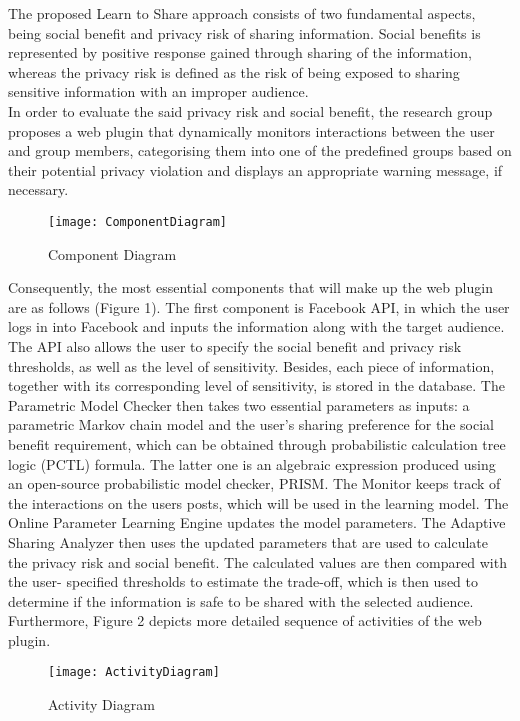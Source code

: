 \documentclass[a4paper,11pt]{article}
\begin{document}
The proposed Learn to Share approach consists of two fundamental aspects, being social benefit and privacy risk of sharing information. Social benefits is represented by positive response gained through sharing of the information, whereas the privacy risk is defined as the risk of being exposed to sharing sensitive information with an improper audience.\\
\indent In order to evaluate the said privacy risk and social benefit, the research group proposes a web plugin that dynamically monitors interactions between the user and group members, categorising them into one of the predefined groups based on their potential privacy violation  and displays an appropriate warning message, if necessary. 
\begin{figure}[H]
	\centering
	\texttt{[image: ComponentDiagram]}
	\caption{Component Diagram}
\end{figure}

Consequently, the most essential components that will make up the web plugin are as follows (Figure 1). The first component is Facebook API, in which the user logs in into Facebook and inputs the information along with the target audience. The API also allows the user to specify the social benefit and privacy risk thresholds, as well as the level of sensitivity. Besides, each piece of information, together with its corresponding level of sensitivity, is stored in the database. The Parametric Model Checker then takes two essential parameters as inputs: a parametric Markov chain model and the user's sharing preference for the social benefit requirement, which can be obtained through probabilistic calculation tree logic (PCTL) formula. The latter one is an algebraic expression produced using an open-source probabilistic model checker, PRISM. The Monitor keeps track of the interactions on the user\textquotesingle s posts, which will be used in the learning model. The Online Parameter Learning Engine updates the model parameters. The Adaptive Sharing Analyzer then uses the updated parameters that are used to calculate the privacy risk and social benefit. The calculated values are then compared with the user- specified thresholds to estimate the trade-off, which is then used to determine if the information is safe to be shared with the selected audience.
\\
\indent Furthermore, Figure 2 depicts more detailed sequence of activities of the web plugin. 

\begin{figure}[H]
	\centering
	\texttt{[image: ActivityDiagram]}
	\caption{Activity Diagram}
\end{figure}
\end{document}
